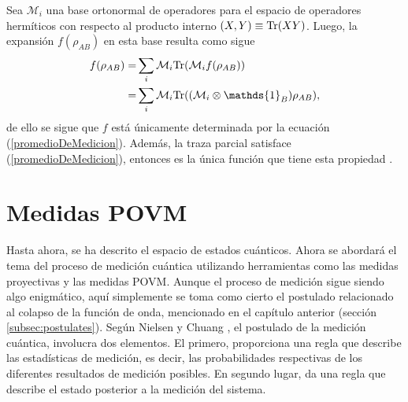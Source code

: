 Sea $\mathcal{M}_i$ una base ortonormal de operadores para el espacio de
operadores hermíticos con respecto al producto interno $(X,Y) \equiv {\rm Tr}(XY)$. Luego, la expansión $f (\rho_{AB} )$ en esta base resulta como sigue
\[\begin{split}
	f(\rho_{AB})=&\sum_{i}\mathcal{M}_i\tr(\mathcal{M}_i f(\rho_{AB}))\\
	=&\sum_{i}\mathcal{M}_i \tr((\mathcal{M}_i\otimes \mathds{1}_B)\rho_{AB}),\\
\end{split}\] 
de ello se sigue que $f$ está únicamente determinada por la ecuación
({\ref{promedioDeMedicion}}). Además, la traza parcial satisface
({\ref{promedioDeMedicion}}), entonces es la única función que tiene esta
propiedad {\cite{nielsen_chuang_2010}}.

\section{Medidas POVM}\label{sec:Cap1:MedidaPOVM} %
Hasta ahora, se ha descrito el espacio de estados cuánticos. Ahora se abordará
el tema del proceso de medición cuántica utilizando herramientas como las
medidas proyectivas y las medidas POVM\@. Aunque el proceso de medición  sigue siendo algo enigmático,
aquí simplemente se toma como cierto el postulado relacionado al colapso de la
función de onda, mencionado en el capítulo anterior (sección
{\ref{subsec:postulates}}). Según Nielsen y Chuang
{\cite{nielsen_chuang_2010}}, el postulado de la medición cuántica, involucra
dos elementos. El primero, proporciona una regla que describe las estadísticas
de medición, es decir, las probabilidades respectivas de los diferentes
resultados de medición posibles. En segundo lugar, da una regla que describe el
estado posterior a la medición del sistema.



